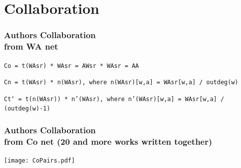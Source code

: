 \documentclass[hyperref={pdfstartview={FitBH -32768},
                         pdfpagemode=FullScreen,
                         plainpages=false,
                         colorlinks=true}
              ]{beamer}
\begin{document}
\section{Collaboration}  

\begin{frame}[fragile]
\frametitle{Authors Collaboration\\ \normalsize from WA net}
\small

\texttt{Co = t(WAsr) * WAsr = AWsr * WAsr = AA} \smallskip

\texttt{Cn = t(WAsr) * n(WAsr), where n(WAsr)[w,a] = WAsr[w,a] / outdeg(w)} \smallskip

\texttt{Ct` = t(n(WAsr)) * n’(WAsr), where n’(WAsr)[w,a] = WAsr[w,a] / (outdeg(w)-1)} \smallskip 

\end{frame}

\begin{frame}[fragile]
\frametitle{Authors Collaboration \\ \normalsize from Co net (20 and more works written together)}

\begin{center}
\texttt{[image: CoPairs.pdf]}
\end{center}

\end{frame}
\end{document}
